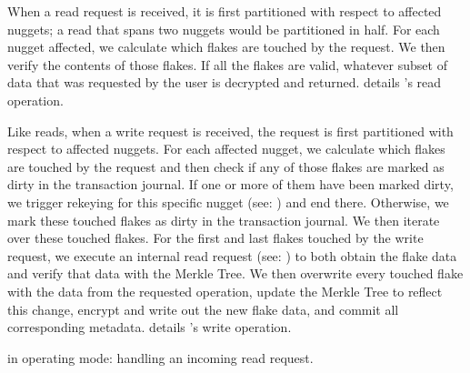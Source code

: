 When a read request is received, it is first partitioned with respect
to affected nuggets; \ie{} a read that spans two nuggets would be
partitioned in half. For each nugget affected, we calculate which
flakes are touched by the request. We then verify the contents of
those flakes. If all the flakes are valid, whatever subset of data
that was requested by the user is decrypted and returned.
 details \SYSTEM{}'s read operation.

Like reads, when a write request is received, the request is first
partitioned with respect to affected nuggets. For each affected
nugget, we calculate which flakes are touched by the request and then
check if any of those flakes are marked as dirty in the transaction
journal. If one or more of them have been marked dirty, we trigger
rekeying for this specific nugget (see: ) and end
there. Otherwise, we mark these touched flakes as dirty in the
transaction journal. We then iterate over these touched flakes. For
the first and last flakes touched by the write request, we execute an
internal read request (see: ) to both obtain the flake
data and verify that data with the Merkle Tree. We then overwrite
every touched flake with the data from the requested operation, update
the Merkle Tree to reflect this change, encrypt and write out the new
flake data, and commit all corresponding metadata. 
details \SYSTEM{}'s write operation.

\begin{algorithm}[h]
\caption{\SYSTEM{} in operating mode: handling an incoming read request.}
\label{algo:read}
\end{algorithm}

